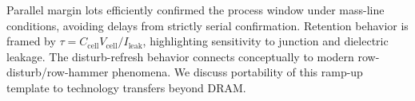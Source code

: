 Parallel margin lots efficiently confirmed the process window under mass-line conditions, avoiding delays from strictly serial confirmation. Retention behavior is framed by $\tau = C_{\mathrm{cell}} V_{\mathrm{cell}} / I_{\mathrm{leak}}$, highlighting sensitivity to junction and dielectric leakage. The disturb-refresh behavior connects conceptually to modern row-disturb/row-hammer phenomena. We discuss portability of this ramp-up template to technology transfers beyond DRAM.
